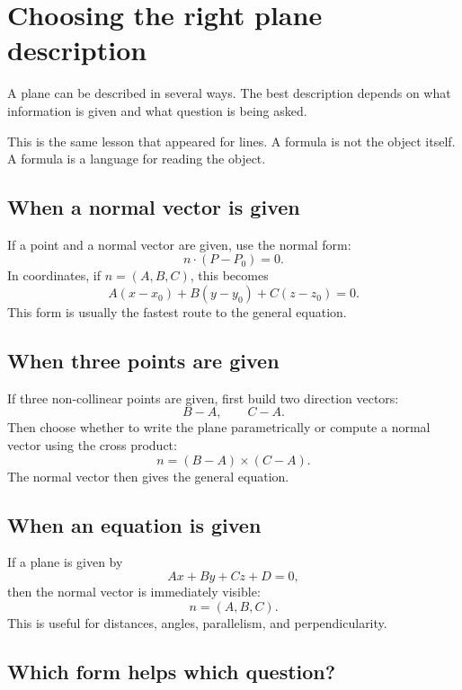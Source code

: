 \section{Choosing the right plane description}

A plane can be described in several ways. The best description depends on what information is given and what question is being asked.

This is the same lesson that appeared for lines. A formula is not the object itself. A formula is a language for reading the object.

\subsection*{When a normal vector is given}

If a point and a normal vector are given, use the normal form:
\[
n\cdot(P-P_0)=0.
\]
In coordinates, if \(n=(A,B,C)\), this becomes
\[
A(x-x_0)+B(y-y_0)+C(z-z_0)=0.
\]
This form is usually the fastest route to the general equation.

\subsection*{When three points are given}

If three non-collinear points are given, first build two direction vectors:
\[
B-A,
\qquad
C-A.
\]
Then choose whether to write the plane parametrically or compute a normal vector using the cross product:
\[
n=(B-A)\times(C-A).
\]
The normal vector then gives the general equation.

\subsection*{When an equation is given}

If a plane is given by
\[
Ax+By+Cz+D=0,
\]
then the normal vector is immediately visible:
\[
n=(A,B,C).
\]
This is useful for distances, angles, parallelism, and perpendicularity.

\subsection*{Which form helps which question?}

